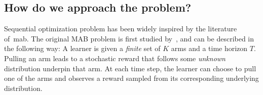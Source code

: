 

\subsection{How do we approach the problem?}\label{sec:intro.context.how}

Sequential optimization problem has been widely inspired by the literature of~\gls{mab}. The original MAB problem is first studied by~\cite{thompson1933}, and can be described in the following way: A learner is given a \emph{finite} set of $K$ arms and a time horizon $T$. Pulling an arm leads to a stochastic reward that follows some \emph{unknown} distribution underpin that arm. At each time step, the learner can choose to pull one of the arms and observes a reward sampled from its corresponding underlying distribution.


